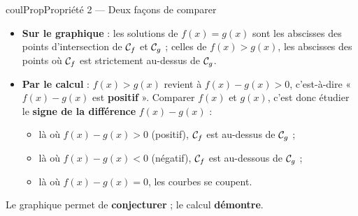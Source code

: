 \documentclass[11pt,a4paper]{article}
\makeatletter
\providecommand{\Cf}{\mathcal{C}\sb{f}}%
\providecommand{\Cg}{\mathcal{C}\sb{g}}%
\newcounter{lycee@signet}
\newcommand{\signet}[3][]{\stepcounter{lycee@signet}%
  \edef\lycee@dest{\if\relax\detokenize{#1}\relax
    signet.\arabic{lycee@signet}\else#1\fi}%
  \hypertarget{\lycee@dest}{}\bookmark[level=#2,dest=\lycee@dest]{#3}}
\newenvironment{proprietebox}[1][Propriété]%
  {\begin{boitecours}[phantom={\signet{2}{#1}}]{coulProp}{#1}}{\end{boitecours}}
\makeatother
\begin{document}
\begin{proprietebox}[Propriété 2 --- Deux façons de comparer]
\begin{itemize}
  \item \textbf{Sur le graphique} : les solutions de $f(x)=g(x)$ sont les abscisses des
        points d'intersection de $\Cf$ et $\Cg$ ; celles de $f(x)>g(x)$, les abscisses
        des points où $\Cf$ est strictement au-dessus de $\Cg$.
  \item \textbf{Par le calcul} : $f(x)>g(x)$ revient à $f(x)-g(x)>0$, c'est-à-dire
        « $f(x)-g(x)$ est \textbf{positif} ». Comparer $f(x)$ et $g(x)$, c'est donc
        étudier le \textbf{signe de la différence} $f(x)-g(x)$ :
        \begin{itemize}
          \item là où $f(x)-g(x)>0$ (positif), $\Cf$ est au-dessus de $\Cg$ ;
          \item là où $f(x)-g(x)<0$ (négatif), $\Cf$ est au-dessous de $\Cg$ ;
          \item là où $f(x)-g(x)=0$, les courbes se coupent.
        \end{itemize}
\end{itemize}
Le graphique permet de \textbf{conjecturer} ; le calcul \textbf{démontre}.
\end{proprietebox}
\end{document}
